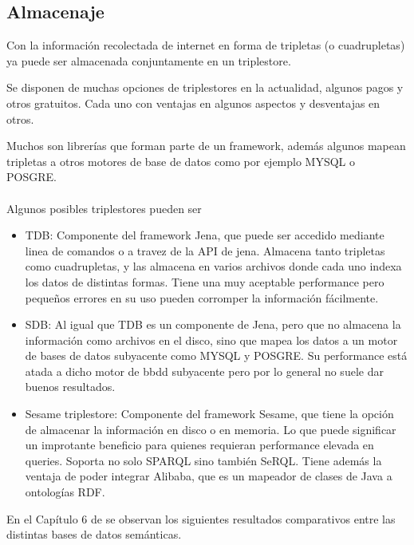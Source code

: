 \subsection{Almacenaje}

Con la información recolectada de internet en forma de tripletas (o cuadrupletas) ya puede ser almacenada conjuntamente en un triplestore. 

Se disponen de muchas opciones de triplestores en la actualidad, algunos pagos y otros gratuitos. Cada uno con ventajas en algunos aspectos y desventajas en otros.

Muchos son librerías que forman parte de un framework, además algunos mapean tripletas a otros motores de base de datos como por ejemplo MYSQL o POSGRE.
\\\\
Algunos posibles triplestores pueden ser
\begin{itemize}
\item TDB: Componente del framework Jena, que puede ser accedido mediante linea de comandos o a travez de la API de jena. Almacena tanto tripletas como cuadrupletas, y las almacena en varios archivos donde cada uno indexa los datos de distintas formas. Tiene una muy aceptable performance pero pequeños errores en su uso pueden corromper la información fácilmente.

\item SDB: Al igual que TDB es un componente de Jena, pero que no almacena la información como archivos en el disco, sino que mapea los datos a un motor de bases de datos subyacente como MYSQL y POSGRE. Su performance está atada a dicho motor de bbdd subyacente pero por lo general no suele dar buenos resultados. 

\item Sesame triplestore: Componente del framework Sesame, que tiene la opción de almacenar la información en disco o en memoria. Lo que puede significar un improtante beneficio para quienes requieran performance elevada en queries. Soporta no solo SPARQL sino también SeRQL. Tiene además la ventaja de poder integrar Alibaba, que es un mapeador de clases de Java a ontologías RDF.
\end{itemize}

\noindent En el Capítulo 6 de \cite{Bizer2001} se observan los siguientes resultados comparativos entre las distintas bases de 
datos semánticas.

